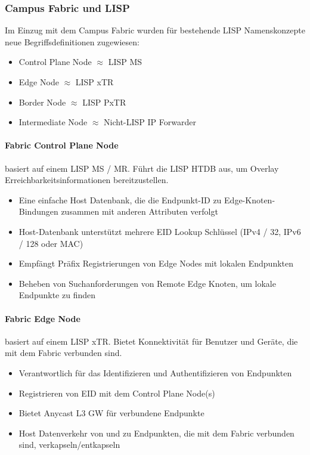 \subsubsection{Campus Fabric und LISP}
Im Einzug mit dem Campus Fabric wurden für bestehende LISP Namenskonzepte neue Begriffsdefinitionen zugewiesen:
\begin{itemize}
	\item Control Plane Node $\approx$ LISP MS
	\item Edge Node $\approx$ LISP xTR
	\item Border Node $\approx$ LISP PxTR
	\item Intermediate Node $\approx$ Nicht-LISP IP Forwarder
\end{itemize}

\paragraph{Fabric Control Plane Node} basiert auf einem LISP MS / MR. Führt die LISP HTDB aus, um Overlay Erreichbarkeitsinformationen bereitzustellen. 
\begin{itemize}
	\item Eine einfache Host Datenbank, die die Endpunkt-ID zu Edge-Knoten-Bindungen zusammen mit anderen Attributen verfolgt
	\item Host-Datenbank unterstützt mehrere EID Lookup Schlüssel (IPv4 / 32, IPv6 / 128 oder MAC)
	\item Empfängt Präfix Registrierungen von Edge Nodes mit lokalen Endpunkten
	\item Beheben von Suchanforderungen von Remote Edge Knoten, um lokale Endpunkte zu finden
\end{itemize}

\paragraph{Fabric Edge Node} basiert auf einem LISP xTR. Bietet Konnektivität für Benutzer und Geräte, die mit dem Fabric verbunden sind.
\begin{itemize}
	\item Verantwortlich für das Identifizieren und Authentifizieren von Endpunkten
	\item Registrieren von EID mit dem Control Plane Node(s)
	\item Bietet Anycast L3 GW für verbundene Endpunkte
	\item Host Datenverkehr von und zu Endpunkten, die mit dem Fabric verbunden sind, verkapseln/entkapseln
\end{itemize}


